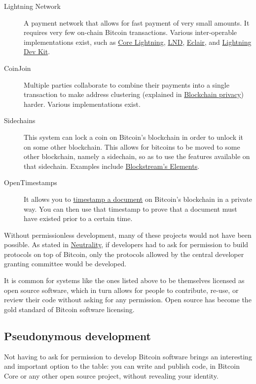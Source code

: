 \begin{description}
\item[Lightning Network]
A payment network that allows for fast payment of very small amounts. It
requires very few on-chain Bitcoin transactions. Various inter-operable
implementations exist, such as
\href{https://github.com/ElementsProject/lightning}{Core Lightning},
\href{https://github.com/lightningnetwork/lnd}{LND},
\href{https://github.com/ACINQ/eclair}{Eclair}, and
\href{https://github.com/lightningdevkit}{Lightning Dev Kit}.
\item[CoinJoin]
Multiple parties collaborate to combine their payments into a single
transaction to make address clustering (explained in
\protect\hyperlink{blockchainprivacy}{Blockchain privacy}) harder.
Various implementations exist.
\item[Sidechains]
This system can lock a coin on Bitcoin's blockchain in order to unlock
it on some other blockchain. This allows for bitcoins to be moved to
some other blockchain, namely a sidechain, so as to use the features
available on that sidechain. Examples include
\href{https://github.com/ElementsProject/elements}{Blockstream's
Elements}.
\item[OpenTimestamps]
It allows you to \href{https://opentimestamps.org/}{timestamp a
document} on Bitcoin's blockchain in a private way. You can then use
that timestamp to prove that a document must have existed prior to a
certain time.
\end{description}

Without permissionless development, many of these projects would not
have been possible. As stated in
\protect\hyperlink{neutrality}{Neutrality}, if developers had to ask for
permission to build protocols on top of Bitcoin, only the protocols
allowed by the central developer granting committee would be developed.

It is common for systems like the ones listed above to be themselves
licensed as open source software, which in turn allows for people to
contribute, re-use, or review their code without asking for any
permission. Open source has become the gold standard of Bitcoin software
licensing.

\hypertarget{_pseudonymous_development}{%
\subsection{Pseudonymous development}\label{_pseudonymous_development}}

Not having to ask for permission to develop Bitcoin software brings an
interesting and important option to the table: you can write and publish
code, in Bitcoin Core or any other open source project, without
revealing your identity.

